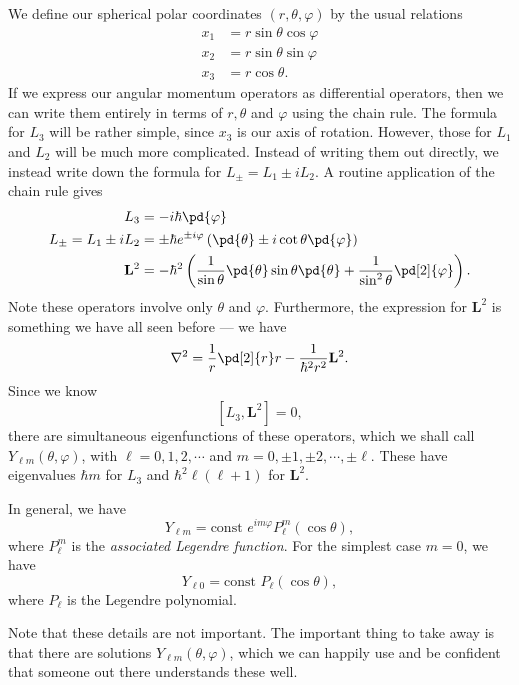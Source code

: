 \documentclass[a4paper]{article}
\begin{document}
We define our spherical polar coordinates $(r, \theta, \varphi)$ by the usual relations
\begin{align*}
  x_1 &= r \sin \theta \cos \varphi\\
  x_2 &= r \sin \theta \sin \varphi\\
  x_3 &= r\cos \theta.
\end{align*}
If we express our angular momentum operators as differential operators, then we can write them entirely in terms of $r, \theta$ and $\varphi$ using the chain rule. The formula for $L_3$ will be rather simple, since $x_3$ is our axis of rotation. However, those for $L_1$ and $L_2$ will be much more complicated. Instead of writing them out directly, we instead write down the formula for $L_{\pm} = L_1 \pm i L_2$. A routine application of the chain rule gives
\begin{align*}
  L_3 &= -i\hbar \pd{\varphi}\\
  L_{\pm} = L_1 \pm i L_2 &= \pm \hbar e^{\pm i\varphi} \left(\pd{\theta} \pm i\cot \theta \pd{\varphi} \right)\\
  \mathbf{L}^2 &= -\hbar^2 \left(\frac{1}{\sin \theta} \pd{\theta} \sin \theta\pd{\theta} + \frac{1}{\sin^2 \theta} \pd[2]{\varphi}\right).
\end{align*}
Note these operators involve only $\theta$ and $\varphi$. Furthermore, the expression for $\mathbf{L}^2$ is something we have all seen before --- we have
\[
  \nabla^2 = \frac{1}{r}\pd[2]{r} r - \frac{1}{\hbar^2 r^2} \mathbf{L}^2.
\]
Since we know
\[
  [L_3 , \mathbf{L}^2] = 0,
\]
there are simultaneous eigenfunctions of these operators, which we shall call $Y_{\ell m}(\theta, \varphi)$, with $\ell = 0, 1, 2, \cdots$ and $m = 0, \pm 1, \pm 2, \cdots, \pm \ell$. These have eigenvalues $\hbar m$ for $L_3$ and $\hbar^2 \ell(\ell + 1)$ for $\mathbf{L}^2$.

In general, we have
\[
  Y_{\ell m} = \text{const } e^{im\varphi} P_{\ell}^m (\cos \theta),
\]
where $P_{\ell}^m$ is the \emph{associated Legendre function}. For the simplest case $m = 0$, we have
\[
  Y_{\ell 0} = \text{const } P_\ell(\cos \theta),
\]
where $P_\ell$ is the Legendre polynomial.

Note that these details are not important. The important thing to take away is that there are solutions $Y_{\ell m}(\theta, \varphi)$, which we can happily use and be confident that someone out there understands these well.
\end{document}
